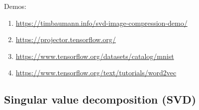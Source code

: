 \documentclass{article}
\begin{document}
Demos:
\begin{enumerate}
\item \url{https://timbaumann.info/svd-image-compression-demo/}
\item \url{https://projector.tensorflow.org/}
\item \url{https://www.tensorflow.org/datasets/catalog/mnist}
\item \url{https://www.tensorflow.org/text/tutorials/word2vec}
\end{enumerate}

\subsection*{Singular value decomposition (SVD)}
\end{document}
